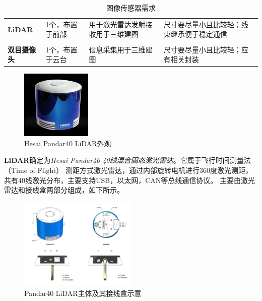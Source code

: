 \begin{table}[H]
	\centering%
	\caption[centering]{图像传感器需求}%
	\label{txxq}%
	\begin{tabular}{C{2cm}C{3cm}p{3cm}p{4cm}}	
		\toprule
		 & & &\\ 
		\midrule
		
		\textbf{LiDAR} & 1个，布置于前部 & 用于激光雷达发射接收用于三维建图 & 尺寸要尽量小且比较轻；线束继承便于稳定通信 \\
		\\
		\textbf{双目摄像头} & 1个，布置于云台 & 信息采集用于三维建图 & 尺寸要尽量小且比较轻；应有相关封装 \\		
		
		\bottomrule
	\end{tabular}
\end{table}

\begin{figure}[H]
	\centering
	\includegraphics[width = 0.3\textwidth]{fig/LiDAR.png}
	\caption{Hesai Pandar40 LiDAR外观}
	\label{LiDAR}
\end{figure}

\textbf{LiDAR}确定为\emph{Hesai Pandar40 40线混合固态激光雷达}。它属于飞行时间测量法（Time of Flight） 测距方式激光雷达，通过内部旋转电机进行360度激光测距，共有40线激光分布，主要支持USB，以太网，CAN等总线通信协议。
主要由激光雷达和接线盒两部分组成，如下所示。

\begin{figure}[H]
	\centering
	\includegraphics[width = 0.5\textwidth]{fig/LiDAR_IO.png}
	\caption{Pandar40 LiDAR主体及其接线盒示意}
	\label{LiDAR主体及其接线盒端口}
\end{figure}

